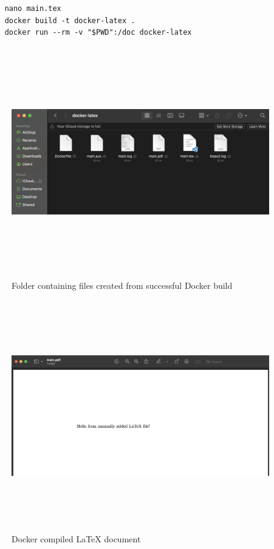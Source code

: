\begin{verbatim}
    nano main.tex
    docker build -t docker-latex . 
    docker run --rm -v "$PWD":/doc docker-latex
\end{verbatim}

\begin{figure}[htp]
    \centering
    \includegraphics[width=15cm, height=10cm]{png/docker/docker-latex.png}
    \caption{Folder containing files created from successful Docker build}
    \label{fig:Part I Folder}
\end{figure}

\begin{figure}[htp]
    \centering
    \includegraphics[width=15cm, height=10cm]{png/docker/docker_latex.png}
    \caption{Docker compiled LaTeX document}
    \label{fig:Part I LaTeX}
\end{figure}
